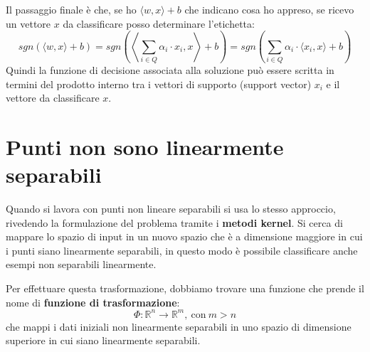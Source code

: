 Il passaggio finale è che, se ho $\langle w, x \rangle + b$ che indicano cosa ho
appreso, se ricevo un vettore $x$ da classificare posso determinare l'etichetta:
\begin{equation}
    sgn(\langle w, x \rangle + b) = sgn\left(\left\langle \sum_{i \in Q} \alpha_i
    \cdot x_i, x \right\rangle + b \right) = sgn\left(\sum_{i \in Q} \alpha_i
    \cdot \langle x_i, x\rangle + b \right)
\end{equation}
Quindi la funzione di decisione associata alla soluzione può essere scritta in
termini del prodotto interno tra i vettori di supporto (support vector) $x_i$ e
il vettore da classificare $x$.
\section{Punti non sono linearmente separabili}
Quando si lavora con punti non lineare separabili si usa lo stesso approccio,
rivedendo la formulazione del problema tramite i \textbf{metodi kernel}.
Si cerca di mappare lo spazio di input in un nuovo spazio che è a dimensione maggiore
in cui i punti siano linearmente separabili, in questo modo è possibile classificare
anche esempi non separabili linearmente.

Per effettuare questa trasformazione, dobbiamo trovare una funzione che prende
il nome di \textbf{funzione di trasformazione}:
\begin{equation}
    \Phi: \mathbb{R}^n \to \mathbb{R}^m, \ \text{con} \ m > n
\end{equation}
che mappi i dati iniziali non linearmente separabili in uno spazio di dimensione
superiore in cui siano linearmente separabili.


